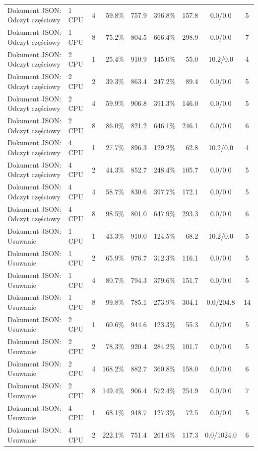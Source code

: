 \begin{table}[ht]
{\begin{tabular}{llcrrrrcc}
Dokument JSON: Odczyt częściowy & 1 CPU & 4 & 59.8\% & 757.9 & 396.8\% & 157.8 & 0.0/0.0 & 5 \\
Dokument JSON: Odczyt częściowy & 1 CPU & 8 & 75.2\% & 804.5 & 666.4\% & 298.9 & 0.0/0.0 & 7 \\
Dokument JSON: Odczyt częściowy & 2 CPU & 1 & 25.4\% & 910.9 & 145.0\% & 55.0 & 10.2/0.0 & 4 \\
Dokument JSON: Odczyt częściowy & 2 CPU & 2 & 39.3\% & 863.4 & 247.2\% & 89.4 & 0.0/0.0 & 5 \\
Dokument JSON: Odczyt częściowy & 2 CPU & 4 & 59.9\% & 906.8 & 391.3\% & 146.0 & 0.0/0.0 & 5 \\
Dokument JSON: Odczyt częściowy & 2 CPU & 8 & 86.0\% & 821.2 & 646.1\% & 246.1 & 0.0/0.0 & 6 \\
Dokument JSON: Odczyt częściowy & 4 CPU & 1 & 27.7\% & 896.3 & 129.2\% & 62.8 & 10.2/0.0 & 4 \\
Dokument JSON: Odczyt częściowy & 4 CPU & 2 & 44.3\% & 852.7 & 248.4\% & 105.7 & 0.0/0.0 & 5 \\
Dokument JSON: Odczyt częściowy & 4 CPU & 4 & 58.7\% & 830.6 & 397.7\% & 172.1 & 0.0/0.0 & 5 \\
Dokument JSON: Odczyt częściowy & 4 CPU & 8 & 98.5\% & 801.0 & 647.9\% & 293.3 & 0.0/0.0 & 6 \\
Dokument JSON: Usuwanie & 1 CPU & 1 & 43.3\% & 910.0 & 124.5\% & 68.2 & 10.2/0.0 & 5 \\
Dokument JSON: Usuwanie & 1 CPU & 2 & 65.9\% & 976.7 & 312.3\% & 116.1 & 0.0/0.0 & 5 \\
Dokument JSON: Usuwanie & 1 CPU & 4 & 80.7\% & 794.3 & 379.6\% & 151.7 & 0.0/0.0 & 5 \\
Dokument JSON: Usuwanie & 1 CPU & 8 & 99.8\% & 785.1 & 273.9\% & 304.1 & 0.0/204.8 & 14 \\
Dokument JSON: Usuwanie & 2 CPU & 1 & 60.6\% & 944.6 & 123.3\% & 55.3 & 0.0/0.0 & 5 \\
Dokument JSON: Usuwanie & 2 CPU & 2 & 78.3\% & 920.4 & 284.2\% & 101.7 & 0.0/0.0 & 5 \\
Dokument JSON: Usuwanie & 2 CPU & 4 & 168.2\% & 882.7 & 360.8\% & 158.0 & 0.0/0.0 & 6 \\
Dokument JSON: Usuwanie & 2 CPU & 8 & 149.4\% & 906.4 & 572.4\% & 254.9 & 0.0/0.0 & 7 \\
Dokument JSON: Usuwanie & 4 CPU & 1 & 68.1\% & 948.7 & 127.3\% & 72.5 & 0.0/0.0 & 5 \\
Dokument JSON: Usuwanie & 4 CPU & 2 & 222.1\% & 751.4 & 261.6\% & 117.3 & 0.0/1024.0 & 6 \\

\end{tabular}}
\end{table}
